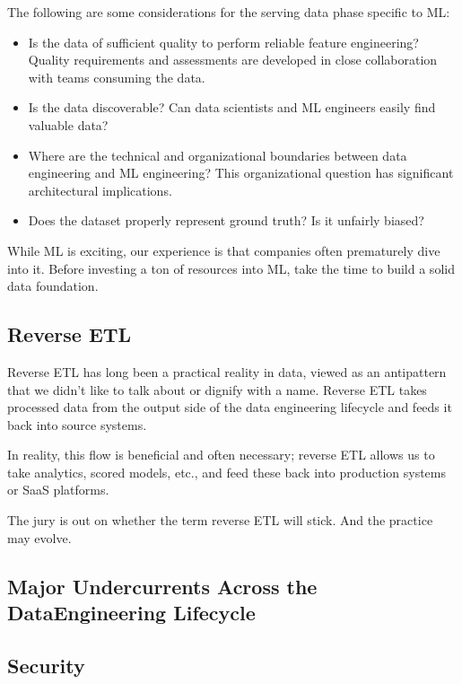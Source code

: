 The following are some considerations for the serving data phase specific to ML:
\begin{itemize}
    \item Is the data of sufficient quality to perform reliable feature engineering? Quality requirements and assessments are developed in close collaboration with teams consuming the data.
    \item Is the data discoverable? Can data scientists and ML engineers easily find valuable data?
    \item Where are the technical and organizational boundaries between data engineering and ML engineering? This organizational question has significant architectural implications.
    \item Does the dataset properly represent ground truth? Is it unfairly biased?
\end{itemize}
While ML is exciting, our experience is that companies often prematurely dive into
it. Before investing a ton of resources into ML, take the time to build a solid data
foundation.



\subsection*{Reverse ETL}
Reverse ETL has long been a practical reality in data, viewed as an antipattern that
we didn't like to talk about or dignify with a name. Reverse ETL takes processed data
from the output side of the data engineering lifecycle and feeds it back into source
systems.

In reality, this flow is beneficial and often necessary;
reverse ETL allows us to take analytics, scored models, etc., and feed these back into
production systems or SaaS platforms.

The jury is out on whether the term reverse ETL will stick. And the practice may
evolve.










\subsection{Major Undercurrents Across the DataEngineering Lifecycle}

\subsection*{Security}
